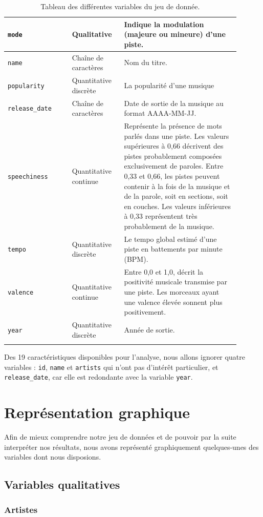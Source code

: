 \documentclass[a4paper, 12pt]{report}
\begin{document}
\begin{longtable}{|p{0.25\linewidth}|p{0.20\linewidth}|p{0.45\linewidth}|}
\hline
\verb|mode| & Qualitative & Indique la modulation (majeure ou mineure) d'une piste. \\
\hline
\verb|name| & Chaîne de caractères & Nom du titre. \\
\hline
\verb|popularity| & Quantitative discrète & La popularité d'une musique \\
\hline
\verb|release_date| & Chaîne de caractères & Date de sortie de la musique au format AAAA-MM-JJ. \\
\hline
\verb|speechiness| & Quantitative continue & Représente la présence de mots parlés dans une piste. Les valeurs supérieures à 0,66 décrivent des pistes probablement composées exclusivement de paroles. Entre 0,33 et 0,66, les pistes peuvent contenir à la fois de la musique et de la parole, soit en sections, soit en couches. Les valeurs inférieures à 0,33 représentent très probablement de la musique. \\
\hline
\verb|tempo| & Quantitative discrète & Le tempo global estimé d'une piste en battements par minute (BPM). \\
\hline
\verb|valence| & Quantitative continue & Entre 0,0 et 1,0, décrit la positivité musicale transmise par une piste. Les morceaux ayant une valence élevée sonnent plus positivement. \\
\hline
\verb|year| & Quantitative discrète & Année de sortie. \\
\hline
\caption{Tableau des différentes variables du jeu de donnée.}
\end{longtable}

Des 19 caractéristiques disponibles pour l'analyse, nous allons ignorer quatre variables : \verb|id|, \verb|name| et \verb|artists| qui n'ont pas d'intérêt particulier, et \verb|release_date|, car elle est redondante avec la variable \verb|year|. 

\section{Représentation graphique}

Afin de mieux comprendre notre jeu de données et de pouvoir par la suite interpréter nos résultats, nous avons représenté graphiquement quelques-unes des variables dont nous disposions.

\subsection{Variables qualitatives}

\subsubsection{Artistes}
\end{document}
